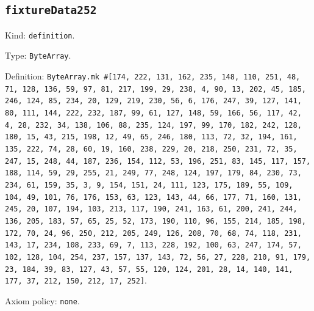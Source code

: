 \documentclass[11pt]{article}
\begin{document}
\subsection*{\texttt{fixtureData252}}
\noindent Kind: \texttt{definition}.\par
\noindent Type: \texttt{ByteArray}.\par
\noindent Definition: \texttt{ByteArray.mk \#[174, 222, 131, 162, 235, 148, 110, 251, 48, 71, 128, 136, 59, 97, 81, 217, 199, 29, 238, 4, 90, 13, 202, 45, 185, 246, 124, 85, 234, 20, 129, 219, 230, 56, 6, 176, 247, 39, 127, 141, 80, 111, 144, 222, 232, 187, 99, 61, 127, 148, 59, 166, 56, 117, 42, 4, 28, 232, 34, 138, 106, 88, 235, 124, 197, 99, 170, 182, 242, 128, 180, 15, 43, 215, 198, 12, 49, 65, 246, 180, 113, 72, 32, 194, 161, 135, 222, 74, 28, 60, 19, 160, 238, 229, 20, 218, 250, 231, 72, 35, 247, 15, 248, 44, 187, 236, 154, 112, 53, 196, 251, 83, 145, 117, 157, 188, 114, 59, 29, 255, 21, 249, 77, 248, 124, 197, 179, 84, 230, 73, 234, 61, 159, 35, 3, 9, 154, 151, 24, 111, 123, 175, 189, 55, 109, 104, 49, 101, 76, 176, 153, 63, 123, 143, 44, 66, 177, 71, 160, 131, 245, 20, 107, 194, 103, 213, 117, 190, 241, 163, 61, 200, 241, 244, 136, 205, 183, 57, 65, 25, 52, 173, 190, 110, 96, 155, 214, 185, 198, 172, 70, 24, 96, 250, 212, 205, 249, 126, 208, 70, 68, 74, 118, 231, 143, 17, 234, 108, 233, 69, 7, 113, 228, 192, 100, 63, 247, 174, 57, 102, 128, 104, 254, 237, 157, 137, 143, 72, 56, 27, 228, 210, 91, 179, 23, 184, 39, 83, 127, 43, 57, 55, 120, 124, 201, 28, 14, 140, 141, 177, 37, 212, 150, 212, 17, 252]}.\par
\noindent Axiom policy: \texttt{none}.\par
\end{document}
